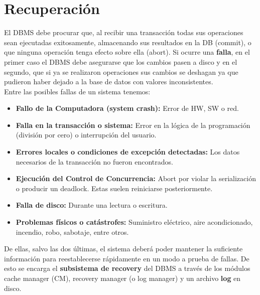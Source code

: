 \section*{Recuperación}
El DBMS debe procurar que, al recibir una transacción todas sus operaciones sean ejecutadas exitosamente, almacenando sus resultados en la DB (commit), o que ninguna operación tenga efecto sobre ella (abort). Si ocurre una \textbf{falla}, en el primer caso el DBMS debe asegurarse que los cambios pasen a disco y en el segundo, que si ya se realizaron operaciones sus cambios se deshagan ya que pudieron haber dejado a la base de datos con valores inconsistentes. \\
Entre las posibles fallas de un sistema tenemos:
\begin{itemize}
    \item \textbf{Fallo de la Computadora (system crash):} Error de HW, SW o red.
    \item \textbf{Falla en la transacción o sistema:} Error en la lógica de la programación (división por cero) o interrupción del usuario.
    \item \textbf{Errores locales o condiciones de excepción detectadas:} Los datos necesarios de la transacción no fueron encontrados.
    \item \textbf{Ejecución del Control de Concurrencia:} Abort por violar la serialización o producir un deadlock. Estas suelen reiniciarse posteriormente.
    \item \textbf{Falla de disco:} Durante una lectura o escritura.
    \item \textbf{Problemas físicos o catástrofes:} Suministro eléctrico, aire acondicionado, incendio, robo, sabotaje, entre otros.
\end{itemize}
De ellas, salvo las dos últimas, el sistema deberá poder mantener la suficiente información para reestablecerse rápidamente en un modo a prueba de fallas. De esto se encarga el \textbf{subsistema de recovery} del DBMS a través de los módulos cache manager (CM), recovery manager (o log manager) y un archivo \textbf{log} en disco.

